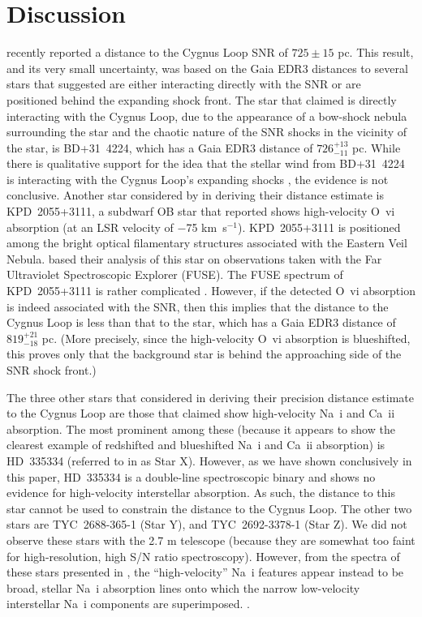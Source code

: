 \documentclass[fleqn,usenatbib]{mnras}
\begin{document}
\section{Discussion}
\citet{f21} recently reported a distance to the Cygnus Loop SNR of $725\pm15$ pc. This result, and its very small uncertainty, was based on the Gaia EDR3 distances to several stars that \citet{f18a,f18b} suggested are either interacting directly with the SNR or are positioned behind the expanding shock front. The star that \citet{f18a} claimed is directly interacting with the Cygnus Loop, due to the appearance of a bow-shock nebula surrounding the star and the chaotic nature of the SNR shocks in the vicinity of the star, is BD+31~4224, which has a Gaia EDR3 distance of $726^{+13}_{-11}$ pc. While there is qualitative support for the idea that the stellar wind from BD+31~4224 is interacting with the Cygnus Loop's expanding shocks \citep[see the discussion in][]{f18a}, the evidence is not conclusive. Another star considered by \citet{f21} in deriving their distance estimate is KPD~2055+3111, a subdwarf OB star that \citet{b09} reported shows high-velocity O~{\sc vi} absorption (at an LSR velocity of $-$75 km~s$^{-1}$). KPD~2055+3111 is positioned among the bright optical filamentary structures associated with the Eastern Veil Nebula. \citet{b09} based their analysis of this star on observations taken with the Far Ultraviolet Spectroscopic Explorer (FUSE). The FUSE spectrum of KPD~2055+3111 is rather complicated \citep[see Figure~7 in][]{b09}. However, if the detected O~{\sc vi} absorption is indeed associated with the SNR, then this implies that the distance to the Cygnus Loop is less than that to the star, which has a Gaia EDR3 distance of $819^{+21}_{-18}$ pc. (More precisely, since the high-velocity O~{\sc vi} absorption is blueshifted, this proves only that the background star is behind the approaching side of the SNR shock front.)

The three other stars that \citet{f21} considered in deriving their precision distance estimate to the Cygnus Loop are those that \citet{f18b} claimed show high-velocity Na~{\sc i} and Ca~{\sc ii} absorption. The most prominent among these (because it appears to show the clearest example of redshifted and blueshifted Na~{\sc i} and Ca~{\sc ii} absorption) is HD~335334 (referred to in \citet{f18b,f21} as Star X). However, as we have shown conclusively in this paper, HD~335334 is a double-line spectroscopic binary and shows no evidence for high-velocity interstellar absorption. As such, the distance to this star cannot be used to constrain the distance to the Cygnus Loop. The other two stars are TYC~2688-365-1 (Star Y), and TYC~2692-3378-1 (Star Z). We did not observe these stars with the 2.7 m telescope (because they are somewhat too faint for high-resolution, high S/N ratio spectroscopy). However, from the spectra of these stars presented in \citet{f18b}, the ``high-velocity'' Na~{\sc i} features appear instead to be broad, stellar Na~{\sc i} absorption lines onto which the narrow low-velocity interstellar Na~{\sc i} components are superimposed. \citep[The Ca~{\sc ii} feature in the spectrum of Star Z is clearly a stellar absorption line; see Figure~3 in][]{f18b}.
\end{document}
